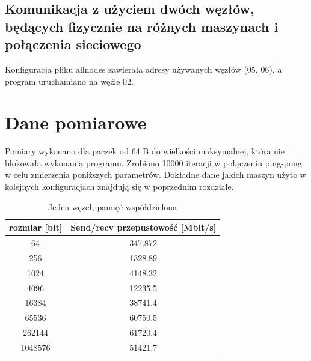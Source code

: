 \documentclass[10pt,english, openany]{book}
\begin{document}
\section{Komunikacja z użyciem dwóch węzłów, będących fizycznie na różnych maszynach i połączenia sieciowego}
Konfiguracja pliku allnodes zawierała adresy używanych węzłów (05, 06), a program uruchamiano na węźle 02.


\chapter{Dane pomiarowe}

Pomiary wykonano dla paczek od 64 B do wielkości maksymalnej, która nie blokowała wykonania programu. Zrobiono 10000 iteracji w połączeniu ping-pong w celu zmierzenia poniższych parametrów. Dokładne dane jakich maszyn użyto w kolejnych konfiguracjach znajdują się w poprzednim rozdziale.

\begin{table}[H]
\caption{Jeden węzeł, pamięć współdzielona}
\begin{center}
\begin{tabular}{|c|c|}
\hline
rozmiar {[}bit{]} & Send/recv przepustowość {[}Mbit/s{]} \\ \hline
64              & 347.872                              \\ \hline
256             & 1328.89                              \\ \hline
1024            & 4148.32                              \\ \hline
4096            & 12235.5                              \\ \hline
16384           & 38741.4                              \\ \hline
65536           & 60750.5                              \\ \hline
262144          & 61720.4                              \\ \hline
1048576         & 51421.7                              \\ \hline
\end{tabular}
\end{center}
\end{table}
\end{document}
